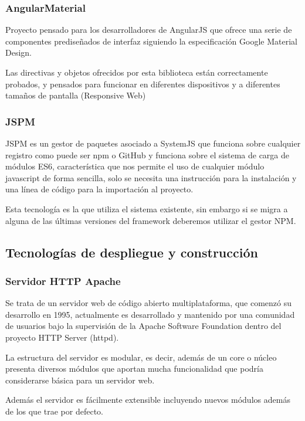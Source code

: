 \subsubsection{AngularMaterial}

Proyecto pensado para los desarrolladores de AngularJS que ofrece una serie de componentes prediseñados de interfaz siguiendo la especificación Google Material Design.

Las directivas y objetos ofrecidos por esta biblioteca están correctamente probados, y pensados para funcionar en diferentes dispositivos y a diferentes tamaños de pantalla (Responsive Web)

\subsubsection{JSPM}

JSPM es un gestor de paquetes asociado a SystemJS que funciona sobre cualquier registro como puede ser npm o GitHub y funciona sobre el sistema de carga de módulos ES6, característica que nos permite el uso de cualquier módulo javascript de forma sencilla, solo se necesita una instrucción para la instalación y una línea de código para la importación al proyecto.

Esta tecnología es la que utiliza el sistema existente, sin embargo si se migra a alguna de las últimas versiones del framework deberemos utilizar el gestor NPM.

\subsection{Tecnologías de despliegue y construcción}

\subsubsection{Servidor HTTP Apache}

Se trata de un servidor web de código abierto multiplataforma, que comenzó su desarrollo en 1995, actualmente es desarrollado y mantenido por una comunidad de usuarios bajo la supervisión de la Apache Software Foundation dentro del proyecto HTTP Server (httpd).

La estructura del servidor es modular, es decir, además de un core o núcleo presenta diversos módulos que aportan mucha funcionalidad que podría considerarse básica para un servidor web.

Además el servidor es fácilmente extensible incluyendo nuevos módulos además de los que trae por defecto.

